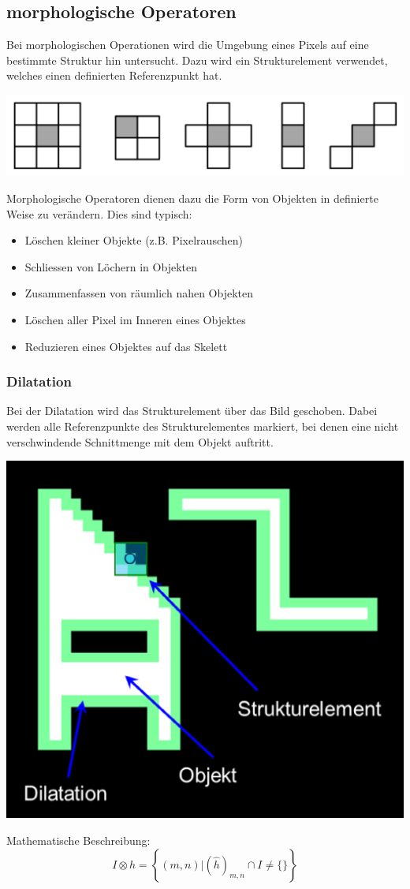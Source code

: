 \subsection{morphologische Operatoren}
Bei morphologischen Operationen wird die Umgebung eines Pixels auf eine bestimmte Struktur hin untersucht.
Dazu wird ein Strukturelement verwendet, welches einen definierten Referenzpunkt hat.
\begin{center}
	\includegraphics[scale=0.5]{../fig/structelem.png}
\end{center}
Morphologische Operatoren dienen dazu die Form von Objekten in definierte Weise zu verändern. 
Dies sind typisch:
\begin{itemize}
	\item Löschen kleiner Objekte (z.B. Pixelrauschen) 
	\item Schliessen von Löchern in Objekten
	\item Zusammenfassen von räumlich nahen Objekten
	\item Löschen aller Pixel im Inneren eines Objektes
	\item Reduzieren eines Objektes auf das Skelett
\end{itemize}

\subsubsection{Dilatation}
Bei der Dilatation wird das Strukturelement über das Bild geschoben.
Dabei werden alle Referenzpunkte des Strukturelementes markiert, bei denen eine nicht verschwindende Schnittmenge mit dem Objekt auftritt.
\begin{center}
	\includegraphics[scale=0.5]{../fig/dilatation.png}
\end{center}
Mathematische Beschreibung:
\[
	I \otimes h = \left\lbrace (m,n) | (\hat{h})_{m,n} \cap I \neq \{\} \right\rbrace
\]

